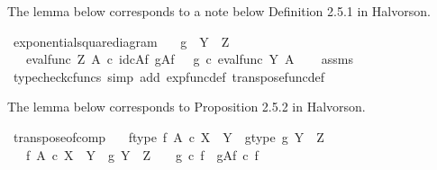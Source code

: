 \begin{isabellebody}
\endisatagproof
{\isafoldproof}%
%
\isadelimproof
%
\endisadelimproof
%
\begin{isamarkuptext}%
The lemma below corresponds to a note below Definition 2.5.1 in Halvorson.%
\end{isamarkuptext}\isamarkuptrue%
\isamarkupfalse%
\ exponential{\isacharunderscore}{\kern0pt}square{\isacharunderscore}{\kern0pt}diagram{\isacharcolon}{\kern0pt}\isanewline
\ \ \ {\isachardoublequoteopen}g\ {\isacharcolon}{\kern0pt}\ Y\ {\isasymrightarrow}\ Z{\isachardoublequoteclose}\isanewline
\ \ \ {\isachardoublequoteopen}{\isacharparenleft}{\kern0pt}eval{\isacharunderscore}{\kern0pt}func\ Z\ A{\isacharparenright}{\kern0pt}\ {\isasymcirc}\isactrlsub c\ {\isacharparenleft}{\kern0pt}id\isactrlsub c{\isacharparenleft}{\kern0pt}A{\isacharparenright}{\kern0pt}{\isasymtimes}\isactrlsub f\ g\isactrlbsup A\isactrlesup \isactrlsub f{\isacharparenright}{\kern0pt}\ \ {\isacharequal}{\kern0pt}\ g\ {\isasymcirc}\isactrlsub c\ {\isacharparenleft}{\kern0pt}eval{\isacharunderscore}{\kern0pt}func\ Y\ A{\isacharparenright}{\kern0pt}{\isachardoublequoteclose}\isanewline
%
\isadelimproof
\ \ %
\endisadelimproof
%
\isatagproof
{}\isamarkupfalse%
\ assms\ \isamarkupfalse%
\ {\isacharparenleft}{\kern0pt}typecheck{\isacharunderscore}{\kern0pt}cfuncs{\isacharcomma}{\kern0pt}\ simp\ add{\isacharcolon}{\kern0pt}\ exp{\isacharunderscore}{\kern0pt}func{\isacharunderscore}{\kern0pt}def{}\ transpose{\isacharunderscore}{\kern0pt}func{\isacharunderscore}{\kern0pt}def{\isacharparenright}{\kern0pt}%
\endisatagproof
{\isafoldproof}%
%
\isadelimproof
%
\endisadelimproof
%
\begin{isamarkuptext}%
The lemma below corresponds to Proposition 2.5.2 in Halvorson.%
\end{isamarkuptext}\isamarkuptrue%
\isamarkupfalse%
\ transpose{\isacharunderscore}{\kern0pt}of{\isacharunderscore}{\kern0pt}comp{\isacharcolon}{\kern0pt}\isanewline
\ \ \ f{\isacharunderscore}{\kern0pt}type{\isacharcolon}{\kern0pt}\ {\isachardoublequoteopen}f{\isacharcolon}{\kern0pt}\ A\ {\isasymtimes}\isactrlsub c\ X\ {\isasymrightarrow}\ Y{\isachardoublequoteclose}\ \ g{\isacharunderscore}{\kern0pt}type{\isacharcolon}{\kern0pt}\ {\isachardoublequoteopen}g{\isacharcolon}{\kern0pt}\ Y\ {\isasymrightarrow}\ Z{\isachardoublequoteclose}\isanewline
\ \ \ {\isachardoublequoteopen}f{\isacharcolon}{\kern0pt}\ A\ {\isasymtimes}\isactrlsub c\ X\ {\isasymrightarrow}\ Y\ {\isasymand}\ g{\isacharcolon}{\kern0pt}\ Y\ {\isasymrightarrow}\ Z\ \ {\isasymLongrightarrow}\ \ {\isacharparenleft}{\kern0pt}g\ {\isasymcirc}\isactrlsub c\ f{\isacharparenright}{\kern0pt}\isactrlsup {\isasymsharp}\ {\isacharequal}{\kern0pt}\ g\isactrlbsup A\isactrlesup \isactrlsub f\ {\isasymcirc}\isactrlsub c\ f\isactrlsup {\isasymsharp}{\isachardoublequoteclose}\isanewline

\end{isabellebody}
